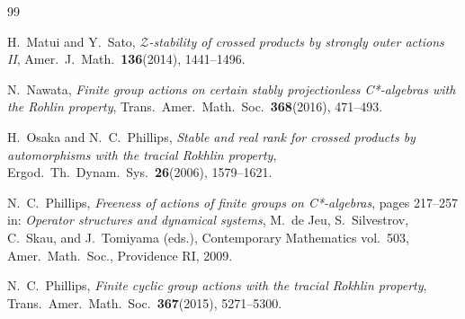 \documentclass[11pt]{amsart}
\theoremstyle{plain}
\theoremstyle{definition}
\theoremstyle{remark}
\numberwithin{equation}{section}
\begin{document}
\begin{thebibliography}{99}




H.~Matui and Y.~Sato,
{\emph{$\mathcal{Z}$-stability of crossed products by
strongly outer actions II}},
Amer.\  J.\  Math.\  {\textbf{136}}(2014), 1441--1496.

N.~Nawata,
{\emph{Finite group actions on certain stably projectionless
  C*-algebras with the Rohlin property}},
Trans.\  Amer.\  Math.\  Soc.\  {\textbf{368}}(2016), 471--493.


H.~Osaka and N.~C.\  Phillips,
{\emph{Stable and real rank for crossed products by
  automorphisms with the tracial Rokhlin property}},
Ergod.\  Th.\  Dynam.\  Sys.\  {\textbf{26}}(2006), 1579--1621.



N.~C.\  Phillips,
{\emph{Freeness of actions of finite groups on C*-algebras}},
pages 217--257 in: {\emph{Operator structures and dynamical systems}},
M.~de Jeu, S.~Silvestrov, C.~Skau, and J.~Tomiyama (eds.),
Contemporary Mathematics vol.~503,
Amer.\  Math.\  Soc., Providence RI, 2009.

 N.~C.\  Phillips,
{\emph{Finite cyclic group actions with the
tracial Rokhlin property}},
Trans.\  Amer.\  Math.\  Soc.\  {\textbf{367}}(2015), 5271--5300.


\end{thebibliography}
\end{document}
